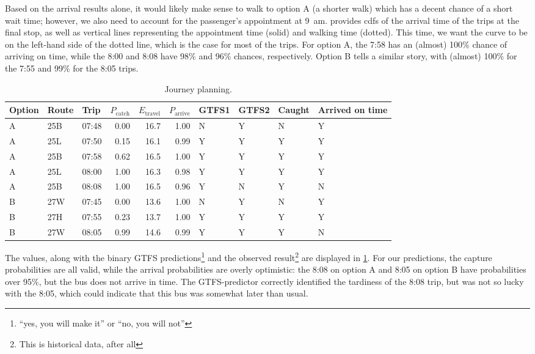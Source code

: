 Based on the arrival results alone, it would likely make sense to walk to option A (a shorter walk) which has a decent chance of a short wait time; however, we also need to account for the passenger's appointment at 9~am.  provides \glspl{cdf} of the arrival time of the trips at the final stop, as well as vertical lines representing the appointment time (solid) and walking time (dotted). This time, we want the curve to be on the left-hand side of the dotted line, which is the case for most of the trips. For option A, the 7:58 has an (almost) 100\% chance of arriving on time, while the 8:00 and 8:08 have 98\% and 96\% chances, respectively. Option B tells a similar story, with (almost) 100\% for the 7:55 and 99\% for the 8:05 trips.


\begin{knitrout}\small
{}\color{fgcolor}\begin{table}

\caption{\label{tab:eta_journey_results}Journey planning.}
\centering
\fontsize{8}{10}\selectfont
\begin{tabular}[t]{lllrrrllll}
\toprule
Option & Route & Trip & $P_\text{catch}$ & $E_\text{travel}$ & $P_\text{arrive}$ & GTFS1 & GTFS2 & Caught & Arrived on time\\
\midrule
A & 25B & 07:48 & 0.00 & 16.7 & 1.00 & N & Y & N & Y\\
A & 25L & 07:50 & 0.15 & 16.1 & 0.99 & Y & Y & Y & Y\\
A & 25B & 07:58 & 0.62 & 16.5 & 1.00 & Y & Y & Y & Y\\
A & 25L & 08:00 & 1.00 & 16.3 & 0.98 & Y & Y & Y & Y\\
A & 25B & 08:08 & 1.00 & 16.5 & 0.96 & Y & N & Y & N\\
\midrule
B & 27W & 07:45 & 0.00 & 13.6 & 1.00 & N & Y & N & Y\\
B & 27H & 07:55 & 0.23 & 13.7 & 1.00 & Y & Y & Y & Y\\
B & 27W & 08:05 & 0.99 & 14.6 & 0.99 & Y & Y & Y & N\\
\bottomrule
\end{tabular}
\end{table}


\end{knitrout}


The values, along with the binary GTFS predictions\footnote{``yes, you will make it'' or ``no, you will not''} and the observed result\footnote{This is historical data, after all} are displayed in \cref{tab:eta_journey_results}. For our predictions, the capture probabilities are all valid, while the arrival probabilities are overly optimistic: the 8:08 on option A and 8:05 on option B have probabilities over 95\%, but the bus does not arrive in time. The GTFS-predictor correctly identified the tardiness of the 8:08 trip, but was not so lucky with the 8:05, which could indicate that this bus was somewhat later than usual.

